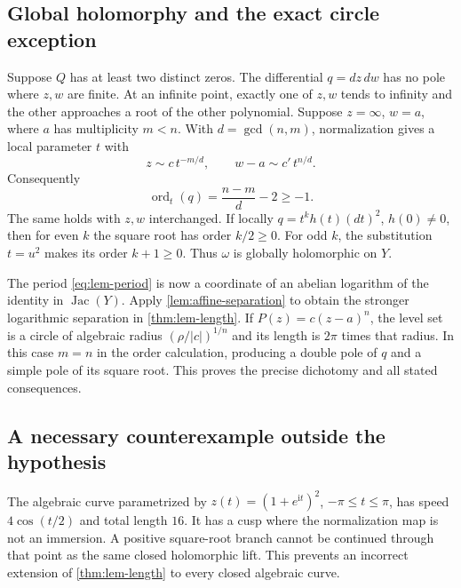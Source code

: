 \documentclass[11pt,a4paper]{article}
\numberwithin{equation}{section}
\theoremstyle{definition}
\theoremstyle{remark}
\newcommand{\Jac}{\operatorname{Jac}}
\newcommand{\ord}{\operatorname{ord}}
\newcommand{\ii}{\mathrm i}
\begin{document}
\subsection{Global holomorphy and the exact circle exception}
Suppose $Q$ has at least two distinct zeros. The differential $q=dz\,dw$
has no pole where $z,w$ are finite. At an infinite point, exactly one of
$z,w$ tends to infinity and the other approaches a root of the other
polynomial. Suppose $z=\infty$, $w=a$, where $a$ has multiplicity $m<n$.
With $d=\gcd(n,m)$, normalization gives a local parameter $t$ with
\[
 z\sim c\,t^{-m/d},\qquad w-a\sim c'\,t^{n/d}.
\]
Consequently
\begin{equation}\label{eq:lem-order}
 \ord_t(q)=\frac{n-m}{d}-2\ge-1.
\end{equation}
The same holds with $z,w$ interchanged. If locally
$q=t^kh(t)(dt)^2$, $h(0)\ne0$, then for even $k$ the square root has order
$k/2\ge0$. For odd $k$, the substitution $t=u^2$ makes its order
$k+1\ge0$. Thus $\omega$ is globally holomorphic on $Y$.

The period \eqref{eq:lem-period} is now a coordinate of an abelian logarithm
of the identity in $\Jac(Y)$. Apply \cref{lem:affine-separation} to obtain
the stronger logarithmic separation in \cref{thm:lem-length}. If
$P(z)=c(z-a)^n$, the level set is a circle of algebraic radius
$(\rho/|c|)^{1/n}$ and its length is $2\pi$ times that radius. In this
case $m=n$ in the order calculation, producing a double pole of $q$ and a
simple pole of its square root. This proves the precise dichotomy and all
stated consequences.

\subsection{A necessary counterexample outside the hypothesis}
The algebraic curve parametrized by
$z(t)=(1+e^{\ii t})^2$, $-\pi\le t\le\pi$, has speed
$4\cos(t/2)$ and total length $16$. It has a cusp where the normalization
map is not an immersion. A positive square-root branch cannot be continued
through that point as the same closed holomorphic lift. This prevents an
incorrect extension of \cref{thm:lem-length} to every closed algebraic curve.
\end{document}
